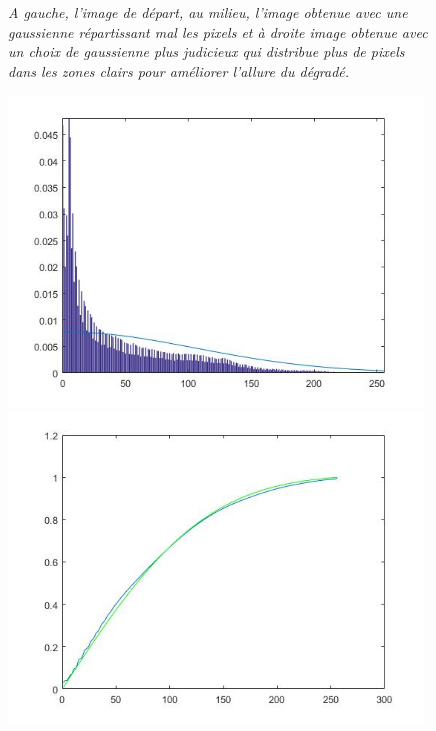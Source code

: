 \documentclass{article}
\begin{document}
\begin{figure}[!hbt]
\begin{minipage}{0.33\textwidth}
\end{minipage}
\caption{\textit{A gauche, l'image de départ, au milieu, l'image obtenue avec une gaussienne répartissant mal les pixels et à droite image obtenue avec un choix de gaussienne plus judicieux qui distribue plus de pixels dans les zones clairs pour améliorer l'allure du dégradé.}}
\label{fig:malta}
\end{figure}

\begin{figure}[!hbt]
\centering
\begin{minipage}{0.25\textwidth}
\centering
\includegraphics[width=0.98\textwidth]{images/p3_bungalow_hist.jpg}
\end{minipage}%
\begin{minipage}{0.25\textwidth}
\centering
\includegraphics[width=0.98\textwidth]{images/p3_bungalow_cumsum.jpg}

\end{minipage}
\end{figure}
\end{document}
